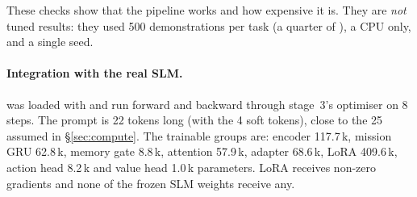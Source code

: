 These checks show that the pipeline works and how expensive it is. They are \emph{not} tuned results: they used
500 demonstrations per task (a quarter of ), a CPU only, and a single seed.

\paragraph{Integration with the real SLM.}  was loaded with  and run forward
and backward through stage~3's optimiser on 8 steps. The prompt is 22 tokens long (with the 4 soft tokens), close to the
25 assumed in \S\ref{sec:compute}. The trainable groups are: encoder 117.7\,k, mission GRU 62.8\,k, memory gate 8.8\,k,
attention 57.9\,k, adapter 68.6\,k, LoRA 409.6\,k, action head 8.2\,k and value head 1.0\,k parameters. LoRA receives
non-zero gradients and none of the frozen SLM weights receive any.

